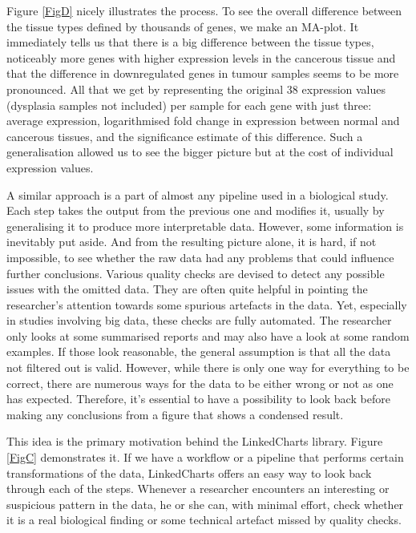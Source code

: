 \documentclass[twocolumn,10pt]{article}
\begin{document}
Figure \ref{FigD} nicely illustrates the process. To see the overall difference between the tissue types defined by thousands of genes, we make an MA-plot. It immediately tells us that there is a big difference between the tissue types, noticeably more genes with higher expression levels in the cancerous tissue and that the difference in downregulated genes in tumour samples seems to be more pronounced. All that we get by representing the original 38 expression values (dysplasia samples not included) per sample for each gene with just three: average expression, logarithmised fold change in expression between normal and cancerous tissues, and the significance estimate of this difference. Such a generalisation allowed us to see the bigger picture but at the cost of individual expression values.

A similar approach is a part of almost any pipeline used in a biological study. Each step takes the output from the previous one and modifies it, usually by generalising it to produce more interpretable data. However, some information is inevitably put aside. And from the resulting picture alone, it is hard, if not impossible, to see whether the raw data had any problems that could influence further conclusions. Various quality checks are devised to detect any possible issues with the omitted data. They are often quite helpful in pointing the researcher's attention towards some spurious artefacts in the data. Yet, especially in studies involving big data, these checks are fully automated. The researcher only looks at some summarised reports and may also have a look at some random examples. If those look reasonable, the general assumption is that all the data not filtered out is valid. However, while there is only one way for everything to be correct, there are numerous ways for the data to be either wrong or not as one has expected. Therefore, it's essential to have a possibility to look back before making any conclusions from a figure that shows a condensed result.

This idea is the primary motivation behind the LinkedCharts library. Figure \ref{FigC} demonstrates it. If we have a workflow or a pipeline that performs certain transformations of the data, LinkedCharts offers an easy way to look back through each of the steps. Whenever a researcher encounters an interesting or suspicious pattern in the data, he or she can, with minimal effort, check whether it is a real biological finding or some technical artefact missed by quality checks. 
\end{document}
